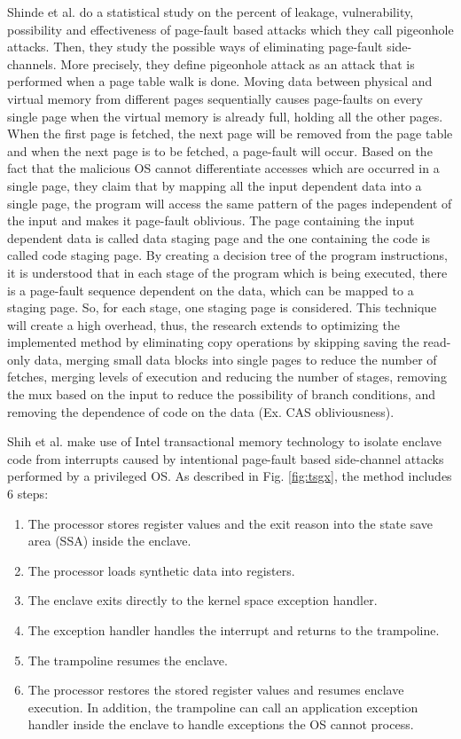Shinde et al. \cite{pigeonhole} do a statistical study on the percent of leakage, vulnerability, possibility and effectiveness of page-fault based attacks which they call pigeonhole attacks. Then, they study the possible ways of eliminating page-fault side-channels. More precisely, they define pigeonhole attack as an attack that is performed when a page table walk is done. Moving data between physical and virtual memory from different pages sequentially causes page-faults on every single page when the virtual memory is already full, holding all the other pages. When the first page is fetched, the next page will be removed from the page table and when the next page is to be fetched, a page-fault will occur. Based on the fact that the malicious OS cannot differentiate accesses which are occurred in a single page, they claim that by mapping all the input dependent data into a single page, the program will access the same pattern of the pages independent of the input and makes it page-fault oblivious. The page containing the input dependent data is called data staging page and the one containing the code is called code staging page. By creating a decision tree of the program instructions, it is understood that in each stage of the program which is being executed, there is a page-fault sequence dependent on the data, which can be mapped to a staging page. So, for each stage, one staging page is considered. This technique will create a high overhead, thus, the research extends to optimizing the implemented method by eliminating copy operations by skipping saving the read-only data, merging small data blocks into single pages to reduce the number of fetches, merging levels of execution and reducing the number of stages, removing the mux based on the input to reduce the possibility of branch conditions, and removing the dependence of code on the data (Ex. CAS obliviousness).

Shih et al. \cite{tsgx} make use of Intel transactional memory technology to isolate enclave code from interrupts caused by intentional page-fault based side-channel attacks performed by a privileged OS. As described in Fig. \ref{fig:tsgx}, the method includes 6 steps:
\begin{enumerate}
	\item The processor stores register values and the exit reason into the state save area (SSA) inside the enclave.
	\item The processor loads synthetic	data into registers.
	\item The enclave exits directly to the kernel space exception handler.
	\item The exception handler handles the interrupt and returns to the trampoline.
	\item The trampoline resumes the enclave.
	\item The processor restores the stored register values and resumes enclave execution. In addition, the trampoline can call an application exception handler inside the enclave to handle exceptions the OS cannot process.
\end{enumerate}


